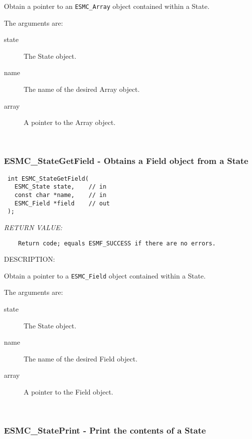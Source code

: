   
    Obtain a pointer to an {\tt ESMC\_Array} object contained within
    a State.
  
    The arguments are:
    \begin{description}
    \item[state]
      The State object.
    \item[name]
      The name of the desired Array object.
    \item[array]
      A pointer to the Array object.
    \end{description}
   
 
\mbox{}\hrulefill\ 
 
\subsubsection [ESMC\_StateGetField] {ESMC\_StateGetField - Obtains a Field object from a State}


  
\begin{verbatim} int ESMC_StateGetField(
   ESMC_State state,    // in
   const char *name,    // in
   ESMC_Field *field    // out
 );\end{verbatim}{\em RETURN VALUE:}
\begin{verbatim}    Return code; equals ESMF_SUCCESS if there are no errors.\end{verbatim}
{\sf DESCRIPTION:\\ }


  
    Obtain a pointer to a {\tt ESMC\_Field} object contained within
    a State.
  
    The arguments are:
    \begin{description}
    \item[state]
      The State object.
    \item[name]
      The name of the desired Field object.
    \item[array]
      A pointer to the Field object.
    \end{description}
   
 
\mbox{}\hrulefill\ 
 
\subsubsection [ESMC\_StatePrint] {ESMC\_StatePrint - Print the contents of a State}


